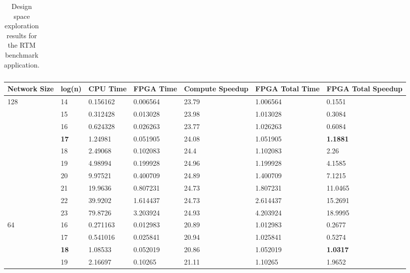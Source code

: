 \begin{sidewaystable}
\begin{tabularx}{\textheight}{p{3.5cm}|X|X|X|X|X|X|X|X|X|X|X|X|p{1cm}|}
    \end{tabularx}
    \caption{Design space exploration results for the RTM benchmark application.}
    \label{table:rtm-dse}
  \end{sidewaystable}

\begin{table}
  \renewcommand{\arraystretch}{1.1}
  \begin{tabularx}{\textwidth}{X|X|X|X|X|X|X}
    \hline
    Network Size        & log(n)      & CPU Time & FPGA Time & Compute Speedup & FPGA Total Time & FPGA Total Speedup \\
    \hline \hline
    \multirow{10}{*}{128}   & 14          & 0.156162 & 0.006564  & 23.79           & 1.006564        & 0.1551             \\
    & 15          & 0.312428 & 0.013028  & 23.98           & 1.013028        & 0.3084             \\
    & 16          & 0.624328 & 0.026263  & 23.77           & 1.026263        & 0.6084             \\
    & \textbf{17} & 1.24981  & 0.051905  & 24.08           & 1.051905        & \textbf{1.1881}    \\
    & 18          & 2.49068  & 0.102083  & 24.4            & 1.102083        & 2.26               \\
    & 19          & 4.98994  & 0.199928  & 24.96           & 1.199928        & 4.1585             \\
    & 20          & 9.97521  & 0.400709  & 24.89           & 1.400709        & 7.1215             \\
    & 21          & 19.9636  & 0.807231  & 24.73           & 1.807231        & 11.0465            \\
    & 22          & 39.9202  & 1.614437  & 24.73           & 2.614437        & 15.2691            \\
    & 23          & 79.8726  & 3.203924  & 24.93           & 4.203924        & 18.9995            \\
    \hline
    \multirow{8}{*}{64} & 16          & 0.271163 & 0.012983  & 20.89           & 1.012983        & 0.2677             \\
    & 17          & 0.541016 & 0.025841  & 20.94           & 1.025841        & 0.5274             \\
    & \textbf{18} & 1.08533  & 0.052019  & 20.86           & 1.052019        & \textbf{1.0317}    \\
    & 19          & 2.16697  & 0.10265   & 21.11           & 1.10265         & 1.9652             \\

\end{tabularx}
\end{table}

